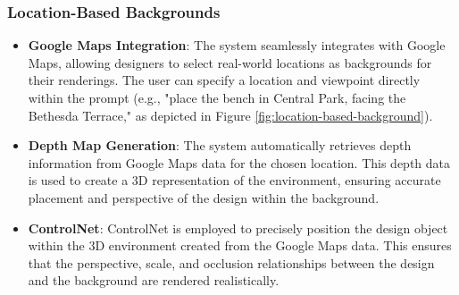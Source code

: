 \documentclass[12pt]{report}
\begin{document}
\subsubsection{Location-Based Backgrounds}
\begin{itemize}
\item \textbf{Google Maps Integration}: The system seamlessly integrates with Google Maps, allowing designers to select real-world locations as backgrounds for their renderings. The user can specify a location and viewpoint directly within the prompt (e.g., "place the bench in Central Park, facing the Bethesda Terrace," as depicted in Figure \ref{fig:location-based-background}).
\item \textbf{Depth Map Generation}: The system automatically retrieves depth information from Google Maps data for the chosen location. This depth data is used to create a 3D representation of the environment, ensuring accurate placement and perspective of the design within the background.
\item \textbf{ControlNet}: ControlNet is employed to precisely position the design object within the 3D environment created from the Google Maps data. This ensures that the perspective, scale, and occlusion relationships between the design and the background are rendered realistically.
\end{itemize}

\end{document}
